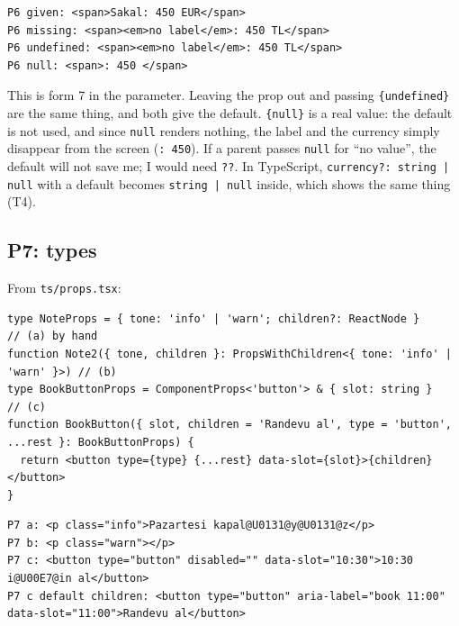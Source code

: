 \begin{lstlisting}
P6 given: <span>Sakal: 450 EUR</span>
P6 missing: <span><em>no label</em>: 450 TL</span>
P6 undefined: <span><em>no label</em>: 450 TL</span>
P6 null: <span>: 450 </span>
\end{lstlisting}

This is form 7 in the parameter. Leaving the prop out and passing \passthrough{\lstinline!\{undefined\}!} are the same thing, and both give the default.
\passthrough{\lstinline!\{null\}!} is a real value: the default is not used, and since \passthrough{\lstinline!null!} renders nothing, the label and the currency simply
disappear from the screen (\passthrough{\lstinline!: 450!}). If a parent passes \passthrough{\lstinline!null!} for ``no value'', the default will not save me; I would need \passthrough{\lstinline!??!}.
In TypeScript, \passthrough{\lstinline!currency?: string | null!} with a default becomes \passthrough{\lstinline!string | null!} inside, which shows the same thing (T4).

\subsection{P7: types}\label{p7-types}

From \passthrough{\lstinline!ts/props.tsx!}:

\begin{lstlisting}
type NoteProps = { tone: 'info' | 'warn'; children?: ReactNode }               // (a) by hand
function Note2({ tone, children }: PropsWithChildren<{ tone: 'info' | 'warn' }>) // (b)
type BookButtonProps = ComponentProps<'button'> & { slot: string }             // (c)
function BookButton({ slot, children = 'Randevu al', type = 'button', ...rest }: BookButtonProps) {
  return <button type={type} {...rest} data-slot={slot}>{children}</button>
}
\end{lstlisting}

\begin{lstlisting}
P7 a: <p class="info">Pazartesi kapal@U0131@y@U0131@z</p>
P7 b: <p class="warn"></p>
P7 c: <button type="button" disabled="" data-slot="10:30">10:30 i@U00E7@in al</button>
P7 c default children: <button type="button" aria-label="book 11:00" data-slot="11:00">Randevu al</button>
\end{lstlisting}

